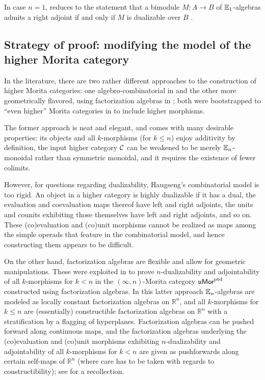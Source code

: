 \documentclass[10pt, reqno, twoside
, final
]{amsart}
\numberwithin{equation}{subsection}%
\theoremstyle{definition}
\theoremstyle{definition}
\theoremstyle{definition}
\theoremstyle{definition}
\theoremstyle{definition}
\theoremstyle{definition}
\theoremstyle{definition}
\theoremstyle{definition}
\theoremstyle{definition}
\theoremstyle{plain}
\theoremstyle{definition}
\theoremstyle{plain}
\theoremstyle{definition}
\theoremstyle{plain}
\theoremstyle{definition}
\theoremstyle{definition}
\theoremstyle{plain}
\theoremstyle{plain}
\theoremstyle{definition}
\theoremstyle{plain}
\theoremstyle{plain}
\theoremstyle{plain}
\begin{document}
In case $n=1$,  reduces to the statement that a bimodule $M:A\to B$ of $\mathbb{E}_1$-algebras admits a right adjoint if and only if $M$ is dualizable over $B$ \cite[Proposition 4.6.2.13]{LurHA}. 

\subsection{Strategy of proof: modifying the model of the higher Morita category}\label{sec:intro_Morita}

In the literature, there are two rather different approaches to the construction of higher Morita categories: one algebro-combinatorial in \cite{HaugsengEn} and the other more geometrically flavored, using factorization algebras in \cite{Scheimbauer}; both were bootstrapped to ``even higher'' Morita categories in \cite{JFS} to include higher morphisms.

The former approach is neat and elegant, and comes with many desirable properties: its objects and all $k$-morphisms (for $k\leq n$) enjoy additivity by definition, the input higher category $\mathcal{C}$ can be weakened to be merely $\mathbb{E}_n$-monoidal rather than symmetric monoidal, and it requires the existence of fewer colimits.

However, for questions regarding dualizability, Haugseng's combinatorial model is too rigid. An object in a higher category is highly dualizable if it has a dual, the evaluation and coevaluation maps
thereof have left and right adjoints, the units and counits exhibiting those themselves have left and right
adjoints, and so on. 
These (co)evaluation and (co)unit morphisms cannot be realized as maps among the simple operads that feature in the combinatorial model, and hence constructing them appears to be difficult.


On the other hand, factorization algebras are flexible and allow for geometric manipulations.
These were exploited in \cite{GS} to prove $n$-dualizability and adjointability of all $k$-morphisms for $k<n$ in the $(\infty,n)$-Morita category $\mathfrak{u}\mathsf{Mor}^{\mathrm{ptd}}$ constructed using factorization algebras. 
In this latter approach $\mathbb{E}_n$-algebras are modeled as locally constant factorization algebras on $\mathbb{R}^n$, and all $k$-morphisms for $k\leq n$ are (essentially) constructible factorization algebras on $\mathbb{R}^n$ with a stratification by a flagging of hyperplanes.
Factorization algebras can be pushed forward along continuous maps, and the factorization algebras underlying the (co)evaluation and (co)unit morphisms exhibiting $n$-dualizability and adjointability of all $k$-morphisms for $k<n$ are given as pushforwards along certain self-maps of $\mathbb{R}^n$ (where care has to be taken with regards to constructibility); see  for a recollection.
\end{document}
